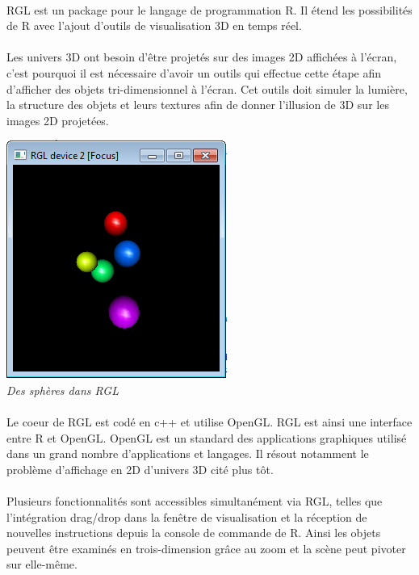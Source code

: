 \paragraph{}
RGL est un package pour le langage de programmation R. Il étend les possibilités de R avec l'ajout d'outils de visualisation 3D en temps réel.
\paragraph{}
Les univers 3D ont besoin d’être projetés sur des images 2D affichées à l’écran, c'est pourquoi il est nécessaire d'avoir un outils qui effectue cette étape afin d'afficher des objets tri-dimensionnel à l’écran. Cet outils doit simuler la lumière, la structure des objets et leurs textures afin de donner l'illusion de 3D sur les images 2D projetées.
\begin{center}
\includegraphics[scale=0.7]{screen_rgl2.png}\\
\textit{Des sphères dans RGL}
\end{center}


\paragraph{}
Le coeur de RGL est codé en c++ et utilise OpenGL. RGL est ainsi une interface entre R et OpenGL. OpenGL est un standard des applications graphiques utilisé dans un grand nombre d'applications et langages. Il résout notamment le problème d'affichage en 2D d'univers 3D cité plus tôt. 
\paragraph{}
Plusieurs fonctionnalités sont accessibles simultanément via RGL, telles que l’intégration drag/drop dans la fenêtre de visualisation et la réception de nouvelles instructions depuis la console de commande de R. Ainsi les objets peuvent être examinés en trois-dimension grâce au zoom et la scène peut pivoter sur elle-même.

